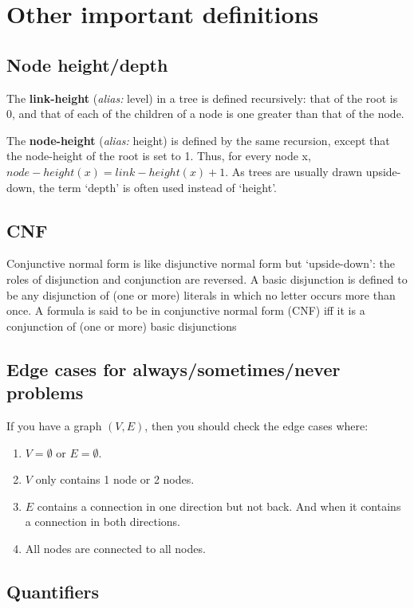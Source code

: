 \documentclass[twocolumn,a4paper]{article}
\begin{document}
\newpage
\section*{Other important definitions}
\subsection*{Node height/depth}
The \textbf{link-height} (\emph{alias:} level) in a tree is defined recursively: that of the root is 0,
and that of each of the children of a node is one greater than that of the node.

The \textbf{node-height} (\emph{alias:} height) is defined by the same recursion,
except that the node-height of the root is set to 1.
Thus, for every node x, \(node-height(x) = link-height(x) + 1\).
As trees are usually drawn upside-down, the term `depth' is often used instead of `height'.

\subsection*{CNF}
Conjunctive normal form is like disjunctive normal form but `upside-down': the roles of disjunction and conjunction are reversed.
A basic disjunction is defined to be any disjunction of (one or more) literals in which no letter occurs more than once.
A formula is said to be in conjunctive normal form (CNF) iff it is a conjunction of (one or more) basic disjunctions

\subsection*{Edge cases for always/sometimes/never problems}
If you have a graph \((V, E)\), then you should check the edge cases where:
\begin{enumerate}
	\item \(V=\emptyset \) or \(E=\emptyset \).
	\item \(V\) only contains 1 node or 2 nodes.
	\item \(E\) contains a connection in one direction but not back. And when it contains a connection in both directions.
	\item All nodes are connected to all nodes.
\end{enumerate}

\subsection*{Quantifiers}
\end{document}
